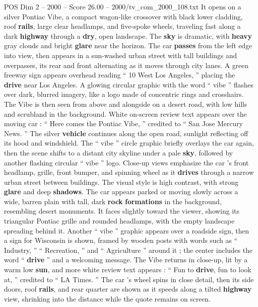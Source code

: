 \begin{textsample}{POS Dim 2 – 2000 – Score 26.00 – 2000/tv\_com\_2000\_108.txt}  \label{ex:f2_pos_023}
It opens on a silver Pontiac Vibe, a compact wagon-like crossover with black lower cladding, roof \textbf{rails}, large clear headlamps, and five-spoke wheels, traveling fast along a dark \textbf{highway} through a \textbf{dry}, open landscape.
The \textbf{sky} is dramatic, with \textbf{heavy} gray clouds and bright \textbf{glare} near the horizon.
The car \textbf{passes} from the left edge into view, then appears in a sun-washed urban street with tall buildings and overpasses, its rear and front alternating as it moves through city lanes.
A green freeway sign appears overhead reading “ 10 West Los Angeles, ” placing the \textbf{drive} near Los Angeles.
A glowing circular graphic with the word “ vibe ” flashes over dark, blurred imagery, like a logo made of concentric rings and crosshairs.
The Vibe is then seen from above and alongside on a desert road, with low hills and scrubland in the background.
White on-screen review text appears over the moving car : “ Here comes the Pontiac Vibe, ” credited to “ San Jose Mercury News. ” The silver \textbf{vehicle} continues along the open road, sunlight reflecting off its hood and windshield.
The “ vibe ” circle graphic briefly overlays the car again, then the scene shifts to a distant city skyline under a pale \textbf{sky}, followed by another flashing circular “ vibe ” logo.
Close-up views emphasize the car ’s front headlamp, grille, front bumper, and spinning wheel as it \textbf{drives} through a narrow urban street between buildings.
The visual style is high contrast, with strong \textbf{glare} and deep \textbf{shadows}.
The car appears parked or moving slowly across a wide, barren plain with tall, dark \textbf{rock} \textbf{formations} in the background, resembling desert monuments.
It faces slightly toward the viewer, showing its triangular Pontiac grille and rounded headlamps, with the empty landscape spreading behind it.
Another “ vibe ” graphic appears over a roadside sign, then a sign for Wisconsin is shown, framed by wooden posts with words such as “ Industry, ” “ Recreation, ” and “ Agriculture ” around it ; the center includes the word “ \textbf{drive} ” and a welcoming message.
The Vibe returns in close-up, lit by a warm low \textbf{sun}, and more white review text appears : “ Fun to \textbf{drive}, fun to look at, ” credited to “ LA Times. ” The car ’s wheel spins in close detail, then its side doors, roof \textbf{rails}, and rear quarter are shown as it speeds along a tilted \textbf{highway} view, shrinking into the distance while the quote remains on screen.

\end{textsample}
